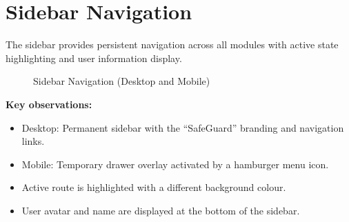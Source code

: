 \section{Sidebar Navigation}

The sidebar provides persistent navigation across all modules with active state highlighting and user information display.

\begin{figure}[H]
  \centering
  \begin{minipage}{0.3\textwidth}
    \centering
  \end{minipage}
  \hfill
  \begin{minipage}{0.6\textwidth}
    \centering
  \end{minipage}
  \caption{Sidebar Navigation (Desktop and Mobile)}
  \label{fig:screenshot-sidebar}
\end{figure}

\textbf{Key observations:}
\begin{itemize}
  \item Desktop: Permanent sidebar with the ``SafeGuard'' branding and navigation links.
  \item Mobile: Temporary drawer overlay activated by a hamburger menu icon.
  \item Active route is highlighted with a different background colour.
  \item User avatar and name are displayed at the bottom of the sidebar.
\end{itemize}


